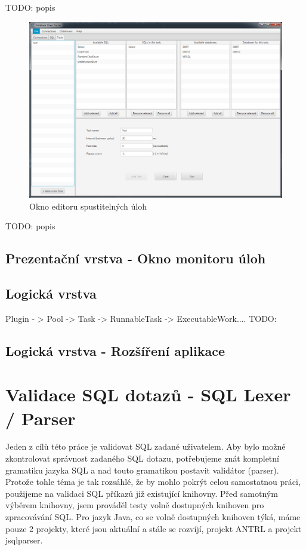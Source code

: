 \documentclass[czech,bachelor,public,dept460,male,cpdeclaration,twoside]{diploma}
\begin{document}
TODO: popis

\newpage
\begin{figure}[!htbp]\centering\includegraphics[width=1.0\textwidth]{Figures/taskeditor.png}\caption{Okno editoru spustitelných úloh}
\end{figure}

TODO: popis

\newpage
\subsection{Prezentační vrstva - Okno monitoru úloh}


\subsection{Logická vrstva} \label{logic}
 Plugin - > Pool -> Task -> RunnableTask -> ExecutableWork.... TODO:
\subsection{Logická vrstva - Rozšíření aplikace} \label{plugins}

\section{Validace SQL dotazů - SQL Lexer / Parser}
Jeden z cílů této práce je validovat SQL zadané uživatelem. Aby bylo možné zkontrolovat správnost zadaného SQL dotazu, potřebujeme znát kompletní gramatiku jazyka SQL a nad touto gramatikou postavit validátor (parser). Protože tohle téma je tak rozsáhlé, že by mohlo pokrýt celou samostatnou práci, použijeme na validaci SQL příkazů již existující knihovny. Před samotným výběrem knihovny, jsem prováděl testy volně dostupných knihoven pro zpracovávání SQL. Pro jazyk Java, co se volně dostupných knihoven týká, máme pouze 2 projekty, které jsou aktuální a stále se rozvíjí, projekt ANTRL a projekt jsqlparser.
\end{document}
